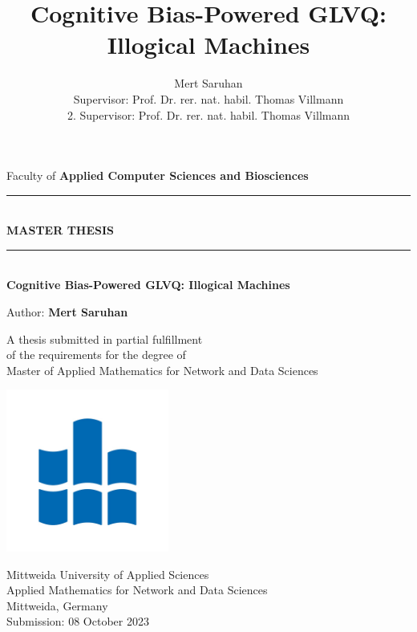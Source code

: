\documentclass[12pt,twoside]{report}
\title{Cognitive Bias-Powered GLVQ: Illogical Machines}
\author{Mert Saruhan\\[.2cm]{\small Supervisor: Prof. Dr. rer. nat. habil. Thomas Villmann}\\[.2cm]{\small 2. Supervisor: Prof. Dr. rer. nat. habil. Thomas Villmann}}
\begin{document}
\begin{titlepage}
  \begin{center}
    \vspace*{1cm}
    Faculty of \textbf{Applied Computer Sciences and Biosciences}\\
    \rule{10cm}{.01cm}\\
    \vspace{\fill}
    \Huge
    \textbf{MASTER THESIS}

    \rule{10cm}{.01cm}\\
      \Huge
      \textbf{Cognitive Bias-Powered GLVQ: Illogical Machines}

      \Large
      \vspace{.5cm}

      Author: \textbf{Mert Saruhan}


      \vspace{0.5cm}
      \large

      \vfill

      \large A thesis submitted in partial fulfillment \\
      of the requirements for the degree of \\
      Master of Applied Mathematics for Network and Data Sciences

      \vspace{0.8cm}
      \vspace{0.8cm}

      \includegraphics[width=0.4\textwidth]{hsmw}

      \Large
      Mittweida University of Applied Sciences\\
      Applied Mathematics for Network and Data Sciences\\
      Mittweida, Germany\\
      \vspace{0.5cm}
      Submission: 08 October 2023

    \end{center}
  \end{titlepage}
\end{document}
